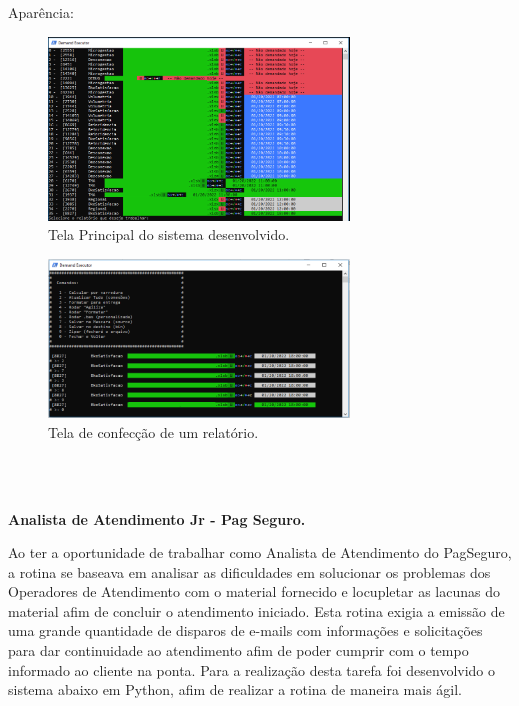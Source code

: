 \documentclass[12pt,a4paper,oneside,sumario=tradicional,brazil]{abntex2}
\begin{document}
	Aparência: \\
	\begin{minipage}{\linewidth}
		\centering
		\begin{minipage}{0.45\linewidth}
			\begin{figure}[H]
				\centering
				\includegraphics[width=8cm]{imgs/vbasis-mask.png}
				\caption{Tela Principal do sistema desenvolvido.}
			\end{figure}
		\end{minipage}
		\hspace{0.05\linewidth}
		\begin{minipage}{0.45\linewidth}
			\begin{figure}[H]
				\includegraphics[width=8cm]{imgs/vbasisbuild-mask.png}
				\caption{Tela de confecção de um relatório.}
			\end{figure}
		\end{minipage}
	\end{minipage} \\

	\
	
	\indent
	\textbf{{\large Analista de Atendimento Jr - Pag Seguro.}} \\
	\indent
	
	Ao ter a oportunidade de trabalhar como Analista de Atendimento do PagSeguro, a rotina se baseava em analisar as dificuldades em solucionar os problemas dos Operadores de Atendimento com o material fornecido e locupletar as lacunas do material afim de concluir o atendimento iniciado. Esta rotina exigia a emissão de uma grande quantidade de disparos de e-mails com informações e solicitações para dar continuidade ao atendimento afim de poder cumprir com o tempo informado ao cliente na ponta. Para a realização desta tarefa foi desenvolvido o sistema abaixo em Python, afim de realizar a rotina de maneira mais ágil. \\
	
\end{document}
